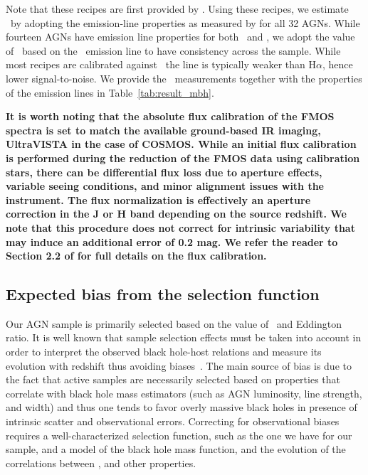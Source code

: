 \documentclass[apj]{emulateapj}
\begin{document}
Note that these recipes are first provided by \citet{Vestergaard2006}. Using these recipes, we estimate \mbh\ by adopting the emission-line properties as measured by \citet{Schulze2018} for all 32 AGNs. While fourteen AGNs have emission line properties for both \halpha\ and \hbeta, we adopt the value of \mbh\ based on the \halpha\ emission line to have consistency across the sample. While most recipes are calibrated against \hbeta\, the line is typically weaker than H$\alpha$, hence lower signal-to-noise. We provide the \mbh\ measurements together with the properties of the emission lines in Table~\ref{tab:result_mbh}.    

{\bf It is worth noting that the absolute flux calibration of the FMOS spectra is set to match the available ground-based IR imaging, UltraVISTA in the case of COSMOS. While an initial flux calibration is performed during the reduction of the FMOS data using calibration stars, there can be differential flux loss due to aperture effects, variable seeing conditions, and minor alignment issues with the instrument. The flux normalization is effectively an aperture correction in the J or H band depending on the source redshift. We note that this procedure does not correct for intrinsic variability that may induce an additional error of 0.2 mag. We refer the reader to Section 2.2 of \citet{Schulze2018} for full details on the flux calibration.}

\subsection{Expected bias from the selection function}

\label{sec:sf_framework}

Our AGN sample is primarily selected based on the value of \mbh~and Eddington ratio. It is well known that sample selection effects must be taken into account in order to  interpret the observed black hole-host relations and measure its evolution with redshift thus avoiding biases~\citep{Tre++07,Schulze2011,Bennert++2011, Schulze2014,Park15}. The main source of bias is due to the fact that active samples are necessarily selected based on properties that correlate with black hole mass estimators (such as AGN luminosity, line strength, and width) and thus one tends to favor overly massive black holes in presence of intrinsic scatter and observational errors. Correcting for observational biases requires a well-characterized selection function, such as the one we have for our sample, and a model of the black hole mass function, and the evolution of the correlations between \mbh, and other properties.
\end{document}
